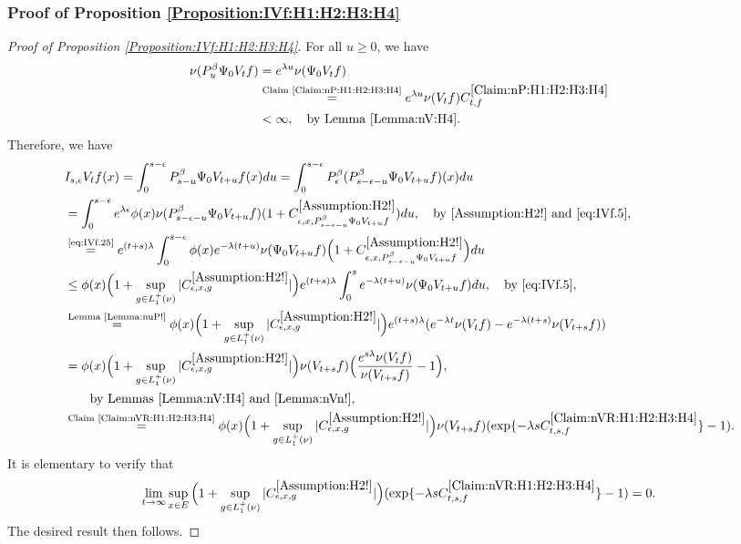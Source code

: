 \documentclass[12pt,a4paper]{amsart}
\numberwithin{equation}{section}
\theoremstyle{plain}
\theoremstyle{definition}
\theoremstyle{remark}
\newcounter{N}
\newcounter{n}[N]
\begin{document}
\subsubsection{Proof of Proposition \ref{Proposition:IVf:H1:H2:H3:H4}}
\label{sec:IVf}
\begin{proof}[Proof of Proposition \ref{Proposition:IVf:H1:H2:H3:H4}]
For all $u\geq 0$, we have 
\begin{align}
\label{eq:IVf.25} \nu(P_u^\beta \Psi_0 V_t f) 
&= e^{\lambda u}\nu(\Psi_0 V_t f)
\\&\overset{\text{Claim \ref{Claim:nP:H1:H2:H3:H4}}}=e^{\lambda u}\nu(V_tf) C^{\ref{Claim:nP:H1:H2:H3:H4}}_{t,f} 
\\\label{eq:IVf.5}&< \infty,\quad\text{by Lemma \ref{Lemma:nV:H4}}.
\end{align} 
Therefore, we have
\begin{align}
 & I_{s,\epsilon} V_t f(x) 
 = \int_0^{s- \epsilon} P_{s-u}^\beta \Psi_0 V_{t+u} f (x) du 
 = \int_0^{s- \epsilon} P_\epsilon^\beta (P_{s - \epsilon - u}^\beta \Psi_0 V_{t+u} f )(x) du 
 \\&= \int_0^{s - \epsilon} e^{\lambda \epsilon} \phi(x) \nu(P_{s - \epsilon - u}^{\beta} \Psi_0 V_{t+u} f)  (1+C^{\ref{Assumption:H2!}}_{\epsilon ,x , P_{s - \epsilon - u}^{\beta} \Psi_0 V_{t+u} f}) du ,\quad\text{by \ref{Assumption:H2!} and \eqref{eq:IVf.5}},
  \\&\overset{\text{\eqref{eq:IVf.25}}}= e^{(t+s)\lambda} \int_0^{s - \epsilon} \phi(x) e^{-\lambda (t+u)}\nu(\Psi_0 V_{t+u} f)  \Big(1+C^{\ref{Assumption:H2!}}_{\epsilon ,x , P_{s - \epsilon - u}^{\beta} \Psi_0 V_{t+u} f}\Big) du
 \\&\leq \phi(x) \Big(1+\sup_{g\in L_1^+(\nu)}|C^{\ref{Assumption:H2!}}_{\epsilon ,x , g}|\Big) e^{(t+s)\lambda} \int_0^{s} e^{-\lambda (t+u)} \nu(\Psi_0 V_{t+u}f)du,\quad\text{by \eqref{eq:IVf.5}},
 \\&\overset{\text{Lemma \ref{Lemma:nuP!}}}= \phi(x) \Big(1+\sup_{g\in L_1^+(\nu)}|C^{\ref{Assumption:H2!}}_{\epsilon ,x , g}|\Big)  e^{(t+s)\lambda} (e^{-\lambda t}\nu(V_tf)- e^{-\lambda(t+s)}\nu(V_{t+s}f))
 \\&= \phi(x) \Big(1+\sup_{g\in L_1^+(\nu)}|C^{\ref{Assumption:H2!}}_{\epsilon ,x , g}|\Big) \nu(V_{t+s}f) \Big( \frac{e^{s \lambda }\nu(V_tf)}{\nu(V_{t+s}f)} - 1\Big),
  \\&\qquad\text{by Lemmas \ref{Lemma:nV:H4} and \ref{Lemma:nVn!}},
 \\&\overset{\text{Claim \ref{Claim:nVR:H1:H2:H3:H4}}}= \phi(x) \Big(1+\sup_{g\in L_1^+(\nu)}|C^{\ref{Assumption:H2!}}_{\epsilon ,x , g}|\Big) \nu(V_{t+s}f) ( \exp\{- \lambda s C^{\ref{Claim:nVR:H1:H2:H3:H4}}_{t,s,f}\} - 1).
 \end{align}
 It is elementary to verify that 
\[\lim_{t\to \infty}\sup_{x\in E}\Big(1+\sup_{g\in L_1^+(\nu)}|C^{\ref{Assumption:H2!}}_{\epsilon ,x , g}|\Big)( \exp\{- \lambda s C^{\ref{Claim:nVR:H1:H2:H3:H4}}_{t,s,f}\} - 1)  = 0. \]
The desired result then follows.
\end{proof}
\end{document}

